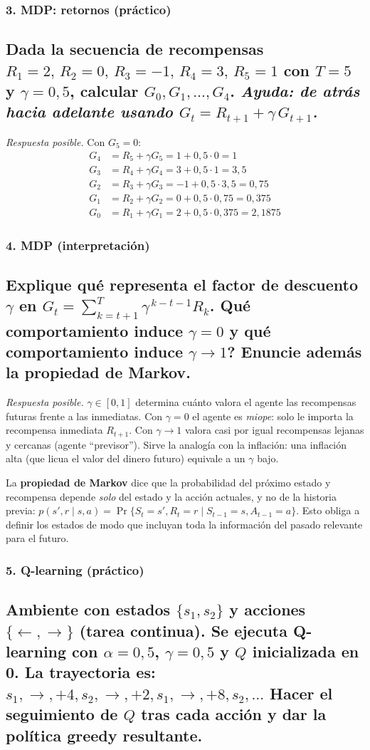 \documentclass[11pt, a4paper]{article}
\newcommand{\pregunta}[1]{\subsection{#1}}
\newcommand{\eje}[1]{\subsubsection{#1}}
\begin{document}
\eje{3. MDP: retornos (pr\'actico)}
\pregunta{Dada la secuencia de recompensas $R_1{=}2,\,R_2{=}0,\,R_3{=}{-}1,\,R_4{=}3,\,R_5{=}1$ con $T=5$ y $\gamma=0{,}5$, calcular $G_0, G_1, \dots, G_4$. \emph{Ayuda: de atr\'as hacia adelante usando $G_t = R_{t+1} + \gamma\,G_{t+1}$.}}

\begin{respuesta}
\textit{Respuesta posible.} Con $G_5 = 0$:
\begin{align*}
G_4 &= R_5 + \gamma G_5 = 1 + 0{,}5\cdot 0 = 1 \\
G_3 &= R_4 + \gamma G_4 = 3 + 0{,}5\cdot 1 = 3{,}5 \\
G_2 &= R_3 + \gamma G_3 = -1 + 0{,}5\cdot 3{,}5 = 0{,}75 \\
G_1 &= R_2 + \gamma G_2 = 0 + 0{,}5\cdot 0{,}75 = 0{,}375 \\
G_0 &= R_1 + \gamma G_1 = 2 + 0{,}5\cdot 0{,}375 = 2{,}1875
\end{align*}
\end{respuesta}

\eje{4. MDP (interpretaci\'on)}
\pregunta{Explique qu\'e representa el \textbf{factor de descuento} $\gamma$ en $G_t = \sum_{k=t+1}^{T}\gamma^{\,k-t-1}R_k$. \textquestiondown Qu\'e comportamiento induce $\gamma=0$ y qu\'e comportamiento induce $\gamma\to 1$? Enuncie adem\'as la \textbf{propiedad de Markov}.}

\begin{respuesta}
\textit{Respuesta posible.} $\gamma \in [0,1]$ determina cu\'anto valora el agente las recompensas futuras frente a las inmediatas. Con \textbf{$\gamma=0$} el agente es \emph{miope}: solo le importa la recompensa inmediata $R_{t+1}$. Con \textbf{$\gamma\to 1$} valora casi por igual recompensas lejanas y cercanas (agente ``previsor''). Sirve la analog\'ia con la inflaci\'on: una inflaci\'on alta (que licua el valor del dinero futuro) equivale a un $\gamma$ bajo.

La \textbf{propiedad de Markov} dice que la probabilidad del pr\'oximo estado y recompensa depende \emph{solo} del estado y la acci\'on actuales, y no de la historia previa: $p(s',r\mid s,a)=\Pr\{S_t{=}s',R_t{=}r \mid S_{t-1}{=}s, A_{t-1}{=}a\}$. Esto obliga a definir los estados de modo que incluyan toda la informaci\'on del pasado relevante para el futuro.
\end{respuesta}

\eje{5. Q-learning (pr\'actico)}
\pregunta{Ambiente con estados $\{s_1, s_2\}$ y acciones $\{\leftarrow, \rightarrow\}$ (tarea continua). Se ejecuta Q-learning con $\alpha=0{,}5$, $\gamma=0{,}5$ y $Q$ inicializada en 0. La trayectoria es: $s_1, \rightarrow, +4, s_2, \rightarrow, +2, s_1, \rightarrow, +8, s_2, \dots$ Hacer el seguimiento de $Q$ tras cada acci\'on y dar la pol\'itica greedy resultante.}
\end{document}

